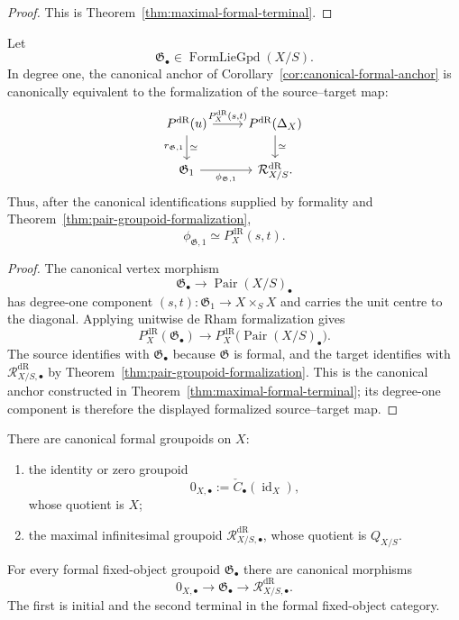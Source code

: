 \begin{proof}
This is Theorem~\ref{thm:maximal-formal-terminal}.
\end{proof}

\begin{proposition}
\label{prop:canonical-anchor-formalized-source-target}
Let
\[
    \mathfrak G_\bullet
    \in
    \operatorname{FormLieGpd}(X/S).
\]
In degree one, the canonical anchor of
Corollary~\ref{cor:canonical-formal-anchor} is canonically equivalent to the
formalization of the source--target map:
\[
\begin{tikzcd}
P^{\mathrm{dR}}(u)
    \arrow[r,"{P_X^{\mathrm{dR}}(s,t)}"]
    \arrow[d,"{r_{\mathfrak G,1}}"',"\simeq"]
&
P^{\mathrm{dR}}(\Delta_X)
    \arrow[d,"\simeq"]
\\
\mathfrak G_1
    \arrow[r,"{\phi_{\mathfrak G,1}}"']
&
\mathcal R^{\mathrm{dR}}_{X/S}.
\end{tikzcd}
\]
Thus, after the canonical identifications supplied by formality and
Theorem~\ref{thm:pair-groupoid-formalization},
\[
    \phi_{\mathfrak G,1}
    \simeq
    P_X^{\mathrm{dR}}(s,t).
\]
\end{proposition}

\begin{proof}
The canonical vertex morphism
\[
    \mathfrak G_\bullet
    \longrightarrow
    \operatorname{Pair}(X/S)_\bullet
\]
has degree-one component $(s,t):\mathfrak G_1\to X\times_SX$ and carries the
unit centre to the diagonal.  Applying unitwise de Rham formalization gives
\[
    P_X^{\mathrm{dR}}(\mathfrak G_\bullet)
    \longrightarrow
    P_X^{\mathrm{dR}}\bigl(\operatorname{Pair}(X/S)_\bullet\bigr).
\]
The source identifies with $\mathfrak G_\bullet$ because $\mathfrak G$ is
formal, and the target identifies with $\mathcal R^{\mathrm{dR}}_{X/S,\bullet}$ by
Theorem~\ref{thm:pair-groupoid-formalization}.  This is the canonical anchor
constructed in Theorem~\ref{thm:maximal-formal-terminal}; its degree-one
component is therefore the displayed formalized source--target map.
\end{proof}

\begin{proposition}
\label{prop:extremal-infinitesimal-groupoids}
There are canonical formal groupoids on $X$:
\begin{enumerate}
    \item the identity or zero groupoid
    \[
        0_{X,\bullet}
        :=
        \check C_\bullet(\operatorname{id}_X),
    \]
    whose quotient is $X$;
    \item the maximal infinitesimal groupoid
    $\mathcal R^{\mathrm{dR}}_{X/S,\bullet}$, whose quotient is $Q_{X/S}$.
\end{enumerate}
For every formal fixed-object groupoid $\mathfrak G_\bullet$ there are
canonical morphisms
\[
    0_{X,\bullet}
    \longrightarrow
    \mathfrak G_\bullet
    \longrightarrow
    \mathcal R^{\mathrm{dR}}_{X/S,\bullet}.
\]
The first is initial and the second terminal in the formal fixed-object
category.
\end{proposition}

